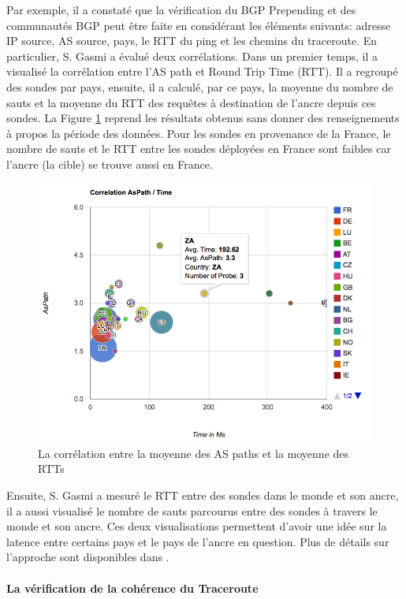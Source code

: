 Par exemple, il a constaté que la vérification du BGP Prepending  et des communautés BGP  peut être faite en  considérant les éléments suivants: adresse IP source, AS source, pays, le RTT du ping et les chemins du traceroute. En particulier, S. Gasmi a évalué deux corrélations. Dans un premier temps, il a visualisé la corrélation entre l'AS path et Round Trip Time (RTT). Il a regroupé des sondes par pays, ensuite, il a calculé, par ce pays, la moyenne du nombre de sauts et la moyenne du RTT des requêtes à destination de l'ancre depuis ces sondes.
La Figure \ref{fig:1-AS-Path-Time-correlationv} reprend les résultats obtenus sans donner des renseignements à propos la période des données. Pour les sondes en provenance de la France,  le nombre de sauts et le RTT entre les sondes déployées en France sont faibles car l'ancre (la cible) se trouve aussi en France.
\begin{figure}[h]
	\centering
	\captionsetup{justification=centering}
	\includegraphics[width=1\linewidth]{illustrations/1-AS-Path-Time-correlation}
	\caption{La corrélation entre la moyenne des AS paths et la moyenne des RTTs \cite{Salim-Gasmi}}
	\label{fig:1-AS-Path-Time-correlationv}
\end{figure}
Ensuite, S. Gasmi a mesuré le RTT entre des sondes dans le monde et son ancre, il a aussi visualisé le nombre de sauts parcourus entre des sondes à travers le monde et son ancre. Ces deux visualisations permettent d'avoir une idée sur la latence entre certains pays et le pays de l'ancre en question. Plus de détails sur l'approche sont disponibles dans \cite{Salim-Gasmi}.
\paragraph{La vérification de la cohérence du Traceroute}~

